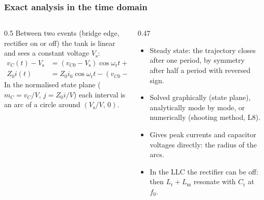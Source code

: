 \begin{frame}
	\frametitle{Exact analysis in the time domain}
	\begin{columns}[T]
		\begin{column}{0.5\textwidth}
			\small
			Between two events (bridge edge, rectifier on or off) the tank is linear and sees a constant voltage $V_\mathrm{s}$:
			\begin{align*}
				v_C(t)-V_\mathrm{s} & =(v_{C0}-V_\mathrm{s})\cos\omega_\mathrm{r}t+Z_0i_0\sin\omega_\mathrm{r}t \\
				Z_0i(t)            & =Z_0i_0\cos\omega_\mathrm{r}t-(v_{C0}-V_\mathrm{s})\sin\omega_\mathrm{r}t
			\end{align*}
			In the normalised state plane ($m_C=v_C/V$, $j=Z_0i/V$) each interval is an arc of a circle around $(V_\mathrm{s}/V,\,0)$.
		\end{column}
		\begin{column}{0.47\textwidth}
			\small
			\begin{itemize}
				\item Steady state: the trajectory closes after one period, by symmetry after half a period with reversed sign.
				\item Solved graphically (state plane), analytically mode by mode, or numerically (shooting method, L8).
				\item Gives peak currents and capacitor voltages directly: the radius of the arcs.
				\item In the LLC the rectifier can be off: then $L_\mathrm{r}+L_\mathrm{m}$ resonate with $C_\mathrm{r}$ at $f_0$.
			\end{itemize}
		\end{column}
	\end{columns}
\end{frame}

